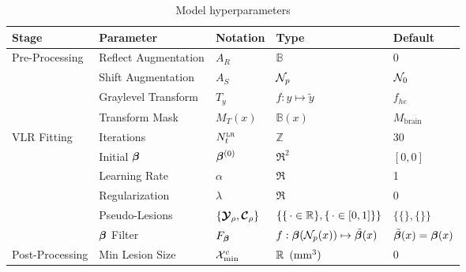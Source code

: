 \begin{table}
  \centering
  \caption{Model hyperparameters}
  \label{tab:hyperparams}
  \begin{tabular}{lllll}
  	\hline
  	Stage                            & Parameter            & Notation                    & Type                                          & Default                   \\ \hline
  	\multirow{4}{*}{Pre-Processing}  & Reflect Augmentation & $A_R$                       & $\mathbb{B}$                                  & 0                         \\
  	                                 & Shift Augmentation   & $A_S$                       & $\mathcal{N}_p$                                        & $\mathcal{N}_0$                    \\
  	                                 & Graylevel Transform  & $T_y$                       & $f: y\mapsto \tilde{y}$                       & $f_{he}$                  \\
  	                                 & Transform Mask       & $M_{T}(x)$                  & $\mathbb{B}(x)$                               & $M_{\text{brain}}$        \\ \hline
  	\multirow{6}{*}{VLR Fitting}     & Iterations           & $N_{t}^{\textsc{lr}}$               & $\mathbb{Z}$                                  & 30                        \\
  	                                 & Initial $\bm{\beta}$        & $\bm{\beta}^{(0)}$                 & $\Re^2$                                       & $[0,0]$                   \\
  	                                 & Learning Rate        & $\alpha$                    & $\Re$                                         & 1                         \\
  	                                 & Regularization       & $\lambda$                   & $\Re$                                         & 0                         \\
  	                                 & Pseudo-Lesions       & $\{\bm{\mathcal{Y}}_{\rho},\bm{\mathcal{C}}_{\rho}\}$ & $\{\{\thinspace\cdot\in\mathbb{R}\},\{\thinspace\cdot\in[0,1]\}\}$ & $\{\{\},\{\}\}$           \\
  	                                 & $\bm{\beta}$ Filter         & $F_{\bm{\beta}}$                   & $f: \bm{\beta}(\mathcal{N}_p(x)) \mapsto \tilde{\bm{\beta}}(x)$      & $\tilde{\bm{\beta}}(x) = \bm{\beta}(x)$ \\ \hline
  	\multirow{3}{*}{Post-Processing} & Min Lesion  Size     & $\mathcal{X}_{\min}^{c}$             & $\mathbb{R}\enspace(\text{mm}^{3})$                       & 0                         \\

\end{tabular}
\end{table}
